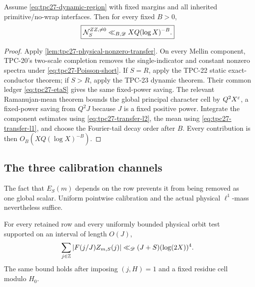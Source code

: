 \begin{theorem}
\label{thm:tpc27-physical-nonzero}
Assume \eqref{eq:tpc27-dynamic-region} with fixed margins and all
inherited primitive/no-wrap interfaces.  Then for every fixed \(B>0\),
\begin{equation}
 \boxed{
 \mathcal N_S^{ZZ,\ne0}
 \ll_{B,\mathscr D}XQ(\log X)^{-B}.}
 \label{eq:tpc27-physical-nonzero}
\end{equation}
\end{theorem}

\begin{proof}
Apply \cref{lem:tpc27-physical-nonzero-transfer}.  On every Mellin
component, TPC-20's two-scale completion removes the single-indicator
and constant nonzero spectra under
\eqref{eq:tpc27-Poisson-short}.  If \(S=R\), apply the TPC-22 static
exact-conductor theorem; if \(S>R\), apply the TPC-23 dynamic theorem.
Their common ledger \eqref{eq:tpc27-etaS} gives the same fixed-power
saving.  The relevant Ramanujan-mean theorem bounds the global
principal character cell by \(Q^2X^\varepsilon\), a fixed-power saving from
\(Q^2J\) because \(J\) is a fixed positive power.  Integrate the
component estimates using \eqref{eq:tpc27-transfer-l2}, the mean using
\eqref{eq:tpc27-transfer-l1}, and choose the Fourier-tail decay order
after \(B\).  Every contribution is then
\(O_B(XQ(\log X)^{-B})\).
\end{proof}

\subsection{The three calibration channels}

The fact that \(E_S(m)\) depends on the row prevents it from being
removed as one global scalar.  Uniform pointwise calibration and the
actual physical \(\ell^1\)-mass nevertheless suffice.

\begin{lemma}
\label{lem:tpc27-centered-orbit-mass}
For every retained row and every uniformly bounded physical orbit
test supported on an interval of length \(O(J)\),
\begin{equation}
 \sum_{j\in\mathbb Z}
 \left|F(j/J)Z_{m,S}(j)\right|
 \ll_{\mathscr D}(J+S)(\log(2X))^4.
 \label{eq:tpc27-centered-orbit-mass}
\end{equation}
The same bound holds after imposing \((j,H)=1\) and a fixed residue
cell modulo \(H_0\).
\end{lemma}

